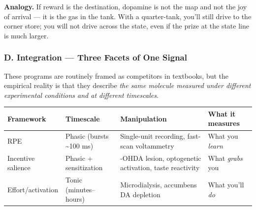 \textbf{Analogy.} If reward is the destination, dopamine is not the map and not the joy of arrival --- it is the gas in the tank. With a quarter-tank, you'll still drive to the corner store; you will not drive across the state, even if the prize at the state line is much larger.

\subsubsection{D. Integration --- Three Facets of One Signal}\label{01_dopamine_substrate-d.-integration-three-facets-of-one-signal}

These programs are routinely framed as competitors in textbooks, but the empirical reality is that they describe \emph{the same molecule measured under different experimental conditions and at different timescales}.

{\def\LTcaptype{none} %
\begin{longtable}[]{@{}
  >{\raggedright\arraybackslash}p{}
  >{\raggedright\arraybackslash}p{}
  >{\raggedright\arraybackslash}p{}
  >{\raggedright\arraybackslash}p{}@{}}
\toprule\noalign{}
\begin{minipage}[b]{\linewidth}\raggedright
Framework
\end{minipage} & \begin{minipage}[b]{\linewidth}\raggedright
Timescale
\end{minipage} & \begin{minipage}[b]{\linewidth}\raggedright
Manipulation
\end{minipage} & \begin{minipage}[b]{\linewidth}\raggedright
What it measures
\end{minipage} \\
\midrule\noalign{}
\endhead
\bottomrule\noalign{}
\endlastfoot
RPE & Phasic (bursts \textasciitilde100 ms) & Single-unit recording, fast-scan voltammetry & What you \emph{learn} \\
Incentive salience & Phasic + sensitization & 6-OHDA lesion, optogenetic activation, taste reactivity & What \emph{grabs} you \\
Effort/activation & Tonic (minutes--hours) & Microdialysis, accumbens DA depletion & What you'll \emph{do} \\
\end{longtable}
}

